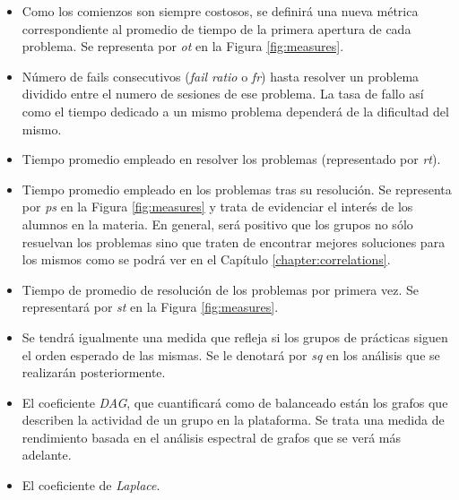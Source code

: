 \begin{itemize}
\item Como los comienzos son siempre costosos, se definirá una nueva métrica correspondiente al promedio de tiempo de la primera apertura de cada problema. Se representa por \emph{ot} en la Figura \ref{fig:measures}.
\item Número de fails consecutivos (\emph{fail ratio} o \emph{fr}) hasta resolver un problema dividido entre el numero de sesiones de ese problema. La tasa de fallo así como el tiempo dedicado a un mismo problema dependerá de la dificultad del mismo.
\item Tiempo promedio empleado en resolver los problemas (representado por \emph{rt}).
\item Tiempo promedio empleado en los problemas tras su resolución. Se representa por \emph{ps} en la Figura \ref{fig:measures} y trata de evidenciar el interés de los alumnos en la materia. En general, será positivo que los grupos no sólo resuelvan los problemas sino que traten de encontrar mejores soluciones para los mismos como se podrá ver en el Capítulo \ref{chapter:correlations}.
\item Tiempo de promedio de resolución de los problemas por primera vez. Se representará por \emph{st} en la Figura \ref{fig:measures}.
\item Se tendrá igualmente una medida que refleja si los grupos de prácticas siguen el orden esperado de las mismas. Se le denotará por \emph{sq} en los análisis que se realizarán posteriormente.
\item El coeficiente \emph{DAG}, que cuantificará como de balanceado están los grafos que describen la actividad de un grupo en la plataforma. Se trata una medida de rendimiento basada en el análisis espectral de grafos que se verá más adelante.
\item El coeficiente de \emph{Laplace}.
\end{itemize}